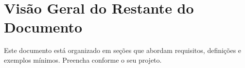
\section{Visão Geral do Restante do Documento}

Este documento está organizado em seções que abordam requisitos, definições e exemplos mínimos. Preencha conforme o seu projeto.
